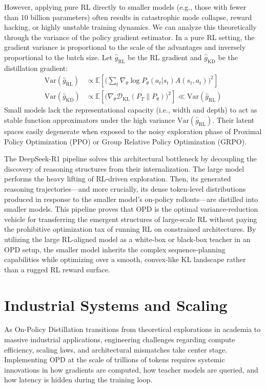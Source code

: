 However, applying pure RL directly to smaller models (e.g., those with fewer than 10 billion parameters) often results in catastrophic mode collapse, reward hacking, or highly unstable training dynamics. We can analyze this theoretically through the variance of the policy gradient estimator. In a pure RL setting, the gradient variance is proportional to the scale of the advantages and inversely proportional to the batch size. Let $\hat{g}_{\text{RL}}$ be the RL gradient and $\hat{g}_{\text{KD}}$ be the distillation gradient:
\begin{align}
\text{Var}(\hat{g}_{\text{RL}}) &\propto \mathbb{E}\left[ \Big( \sum_t \nabla_\theta \log P_\theta(a_t|s_t) A(s_t, a_t) \Big)^2 \right] \\
\text{Var}(\hat{g}_{\text{KD}}) &\propto \mathbb{E}\left[ \Big( \nabla_\theta \mathcal{D}_{\text{KL}}(P_T \parallel P_\theta) \Big)^2 \right] \ll \text{Var}(\hat{g}_{\text{RL}})
\end{align}
Small models lack the representational capacity (i.e., width and depth) to act as stable function approximators under the high variance $\text{Var}(\hat{g}_{\text{RL}})$. Their latent spaces easily degenerate when exposed to the noisy exploration phase of Proximal Policy Optimization (PPO) or Group Relative Policy Optimization (GRPO).

The DeepSeek-R1 pipeline solves this architectural bottleneck by decoupling the discovery of reasoning structures from their internalization. The large model performs the heavy lifting of RL-driven exploration. Then, its generated reasoning trajectories—and more crucially, its dense token-level distributions produced in response to the smaller model's on-policy rollouts—are distilled into smaller models. This pipeline proves that OPD is the optimal variance-reduction vehicle for transferring the emergent structures of large-scale RL without paying the prohibitive optimization tax of running RL on constrained architectures. By utilizing the large RL-aligned model as a white-box or black-box teacher in an OPD setup, the smaller model inherits the complex sequence-planning capabilities while optimizing over a smooth, convex-like KL landscape rather than a rugged RL reward surface.

\section{Industrial Systems and Scaling}
\label{sec:systems}

As On-Policy Distillation transitions from theoretical explorations in academia to massive industrial applications, engineering challenges regarding compute efficiency, scaling laws, and architectural mismatches take center stage. Implementing OPD at the scale of trillions of tokens requires systemic innovations in how gradients are computed, how teacher models are queried, and how latency is hidden during the training loop.


